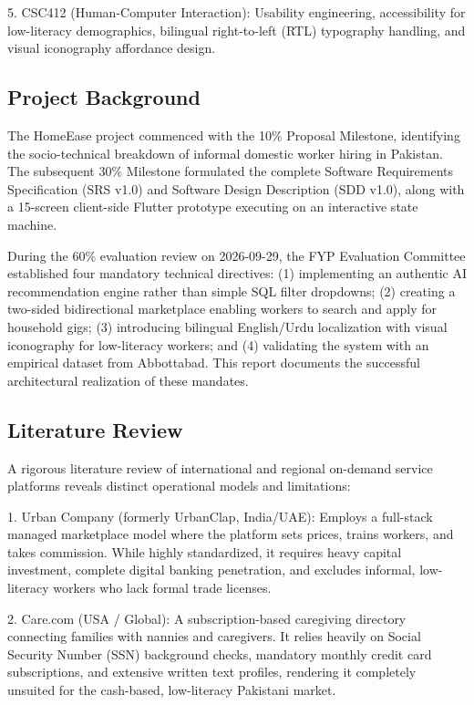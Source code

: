 \documentclass[12pt,a4paper]{article}
\begin{document}
5. CSC412 (Human-Computer Interaction): Usability engineering, accessibility for low-literacy demographics, bilingual right-to-left (RTL) typography handling, and visual iconography affordance design.

\subsection{Project Background}
The HomeEase project commenced with the 10\% Proposal Milestone, identifying the socio-technical breakdown of informal domestic worker hiring in Pakistan. The subsequent 30\% Milestone formulated the complete Software Requirements Specification (SRS v1.0) and Software Design Description (SDD v1.0), along with a 15-screen client-side Flutter prototype executing on an interactive state machine.

During the 60\% evaluation review on 2026-09-29, the FYP Evaluation Committee established four mandatory technical directives: (1) implementing an authentic AI recommendation engine rather than simple SQL filter dropdowns; (2) creating a two-sided bidirectional marketplace enabling workers to search and apply for household gigs; (3) introducing bilingual English/Urdu localization with visual iconography for low-literacy workers; and (4) validating the system with an empirical dataset from Abbottabad. This report documents the successful architectural realization of these mandates.

\subsection{Literature Review}
A rigorous literature review of international and regional on-demand service platforms reveals distinct operational models and limitations:

1. Urban Company (formerly UrbanClap, India/UAE): Employs a full-stack managed marketplace model where the platform sets prices, trains workers, and takes commission. While highly standardized, it requires heavy capital investment, complete digital banking penetration, and excludes informal, low-literacy workers who lack formal trade licenses.

2. Care.com (USA / Global): A subscription-based caregiving directory connecting families with nannies and caregivers. It relies heavily on Social Security Number (SSN) background checks, mandatory monthly credit card subscriptions, and extensive written text profiles, rendering it completely unsuited for the cash-based, low-literacy Pakistani market.
\end{document}
